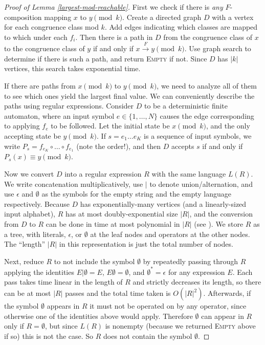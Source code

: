 \documentclass[11pt]{amsart}
\theoremstyle{definition}
\theoremstyle{remark}
\begin{document}
\begin{proof}[Proof of Lemma \ref{largest-mod-reachable}]
First we check if there is \emph{any} $F$-composition mapping $x$ to $y \pmod k$. Create a directed graph $D$ with a vertex for each congruence class mod $k$. Add edges indicating which classes are mapped to which under each $f_i$. Then there is a path in $D$ from the congruence class of $x$ to the congruence class of $y$ if and only if $x \xrightarrow{F} y \pmod k$. Use graph search to determine if there is such a path, and return \textsc{Empty} if not. Since $D$ has $|k|$ vertices, this search takes exponential time.

If there are paths from $x \pmod k$ to $y \pmod k$, we need to analyze all of them to see which ones yield the largest final value. We can conveniently describe the paths using regular expressions. Consider $D$ to be a deterministic finite automaton, where an input symbol $e \in \{1, \dots, N\}$ causes the edge corresponding to applying $f_e$ to be followed. Let the initial state be $x \pmod k$, and the only accepting state be $y \pmod k$. If $s = e_1 \dots e_K$ is a sequence of input symbols, we write $P_s = f_{e_K} \circ \dots \circ f_{e_1}$ (note the order!), and then $D$ accepts $s$ if and only if $P_s(x) \equiv y \pmod k$.

Now we convert $D$ into a regular expression $R$ with the same language $L(R)$. We write concatenation multiplicatively, use $|$ to denote union/alternation, and use $\epsilon$ and $\emptyset$ as the symbols for the empty string and the empty language respectively. Because $D$ has exponentially-many vertices (and a linearly-sized input alphabet), $R$ has at most doubly-exponential size $|R|$, and the conversion from $D$ to $R$ can be done in time at most polynomial in $|R|$ (see \cite{mcnaughton-yamada, dfa-to-re-upper}). We store $R$ as a tree, with literals, $\epsilon$, or $\emptyset$ at the leaf nodes and operators at the other nodes. The ``length'' $|R|$ in this representation is just the total number of nodes.

Next, reduce $R$ to not include the symbol $\emptyset$ by repeatedly passing through $R$ applying the identities $E | \emptyset = E$, $E\emptyset = \emptyset$, and $\emptyset^* = \epsilon$ for any expression $E$. Each pass takes time linear in the length of $R$ and strictly decreases its length, so there can be at most $|R|$ passes and the total time taken is $O(|R|^2)$. Afterwards, if the symbol $\emptyset$ appears in $R$ it must not be operated on by any operator, since otherwise one of the identities above would apply. Therefore $\emptyset$ can appear in $R$ only if $R = \emptyset$, but since $L(R)$ is nonempty (because we returned \textsc{Empty} above if so) this is not the case. So $R$ does not contain the symbol $\emptyset$.


\end{proof}
\end{document}
